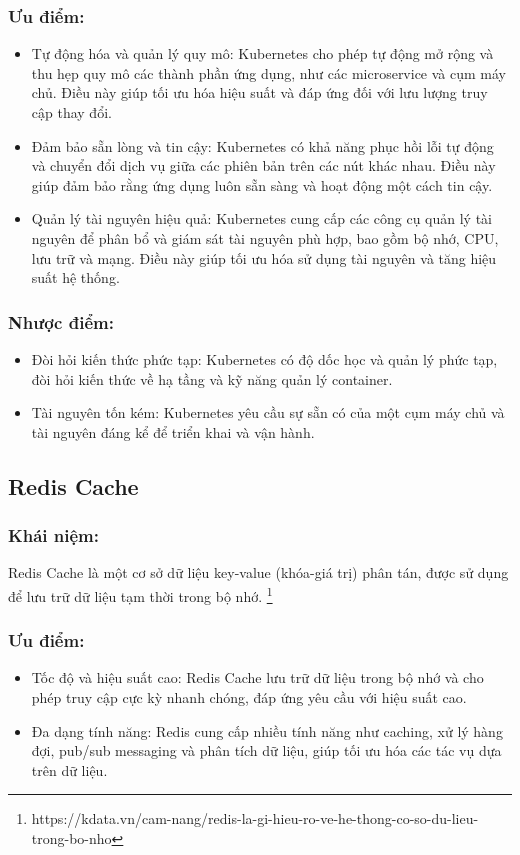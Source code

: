 \subsubsection{Ưu điểm:}
\begin{itemize}
    \item Tự động hóa và quản lý quy mô: Kubernetes cho phép tự động mở rộng và thu hẹp quy mô các thành phần ứng dụng, như các microservice và cụm máy chủ. Điều này giúp tối ưu hóa hiệu suất và đáp ứng đối với lưu lượng truy cập thay đổi.

    \item Đảm bảo sẵn lòng và tin cậy: Kubernetes có khả năng phục hồi lỗi tự động và chuyển đổi dịch vụ giữa các phiên bản trên các nút khác nhau. Điều này giúp đảm bảo rằng ứng dụng luôn sẵn sàng và hoạt động một cách tin cậy.

    \item Quản lý tài nguyên hiệu quả: Kubernetes cung cấp các công cụ quản lý tài nguyên để phân bổ và giám sát tài nguyên phù hợp, bao gồm bộ nhớ, CPU, lưu trữ và mạng. Điều này giúp tối ưu hóa sử dụng tài nguyên và tăng hiệu suất hệ thống.

\end{itemize}
\subsubsection{Nhược điểm:}
\begin{itemize}
    \item Đòi hỏi kiến thức phức tạp: Kubernetes có độ dốc học và quản lý phức tạp, đòi hỏi kiến thức về hạ tầng và kỹ năng quản lý container.
    \item Tài nguyên tốn kém: Kubernetes yêu cầu sự sẵn có của một cụm máy chủ và tài nguyên đáng kể để triển khai và vận hành.
\end{itemize}
\subsection{Redis Cache}
\subsubsection{Khái niệm:}
\indent Redis Cache là một cơ sở dữ liệu key-value (khóa-giá trị) phân tán, được sử dụng để lưu trữ dữ liệu tạm thời trong bộ nhớ. \footnote{https://kdata.vn/cam-nang/redis-la-gi-hieu-ro-ve-he-thong-co-so-du-lieu-trong-bo-nho}
\subsubsection{Ưu điểm:}
\begin{itemize}
    \item Tốc độ và hiệu suất cao: Redis Cache lưu trữ dữ liệu trong bộ nhớ và cho phép truy cập cực kỳ nhanh chóng, đáp ứng yêu cầu với hiệu suất cao.
    \item Đa dạng tính năng: Redis cung cấp nhiều tính năng như caching, xử lý hàng đợi, pub/sub messaging và phân tích dữ liệu, giúp tối ưu hóa các tác vụ dựa trên dữ liệu.
\end{itemize}
